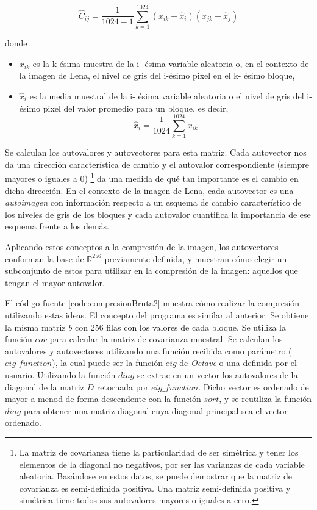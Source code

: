 \documentclass[twocolumn,a4paper,10pt]{article}
\begin{document}
\begin{equation}
    \widehat{C}_{ij} =  \frac{1}{1024 - 1}\sum_{k=1}^{1024} (x_{ik} - \widehat{x}_{i}) (x_{jk} - \widehat{x}_{j})
\end{equation}

donde
\begin{itemize}
    \item $x_{ik}$ es la k-\'esima muestra de la i- \'esima variable aleatoria o, en el contexto de la imagen de Lena, el nivel de gris del i-\'esimo pixel en el 
    k- \'esimo bloque,
    \item $\widehat{x}_{i}$ es la media muestral de la i- \'esima variable aleatoria o el nivel de gris del i-\'esimo pixel del valor promedio para un bloque, es decir,
    \[ \widehat{x}_{i} = \frac{1}{1024} \sum_{k=1}^{1024} x_{ik} \]
\end{itemize}

Se calculan los autovalores y autovectores para esta matriz. Cada autovector nos da una direcci\'on caracter\'istica de cambio y el autovalor correspondiente  (siempre mayores o iguales a 0) \footnote{La matriz de covarianza tiene la particularidad de ser sim\'etrica y tener los elementos de la diagonal no negativos, por ser las varianzas de cada variable aleatoria. Bas\'andose en estos datos, se puede demostrar que la matriz de covarianza es semi-definida positiva. Una matriz semi-definida positiva y sim\'etrica tiene todos sus autovalores mayores o iguales a cero.} da una medida de qu\'e tan importante es el cambio en dicha direcci\'on. En el contexto de la imagen de Lena, cada autovector es una \textit{autoimagen} con información respecto a un esquema de cambio caracter\'istico de los niveles de gris de los bloques y cada autovalor cuantifica la importancia de ese esquema frente a los dem\'as.

Aplicando estos conceptos a la compresión de la imagen, los autovectores conforman la base de $\mathbb{R}^{256}$ previamente definida, y muestran cómo elegir un subconjunto de estos para utilizar en la compresión de la imagen: aquellos que tengan el mayor autovalor.

El código fuente \ref{code:compresionBruta2} muestra cómo realizar la compresión utilizando estas ideas. El concepto del programa es similar al anterior. Se obtiene la misma matriz $b$ con 256 filas con los valores de cada bloque. Se utiliza la función $cov$ para calcular la matriz de covarianza muestral. Se calculan los autovalores y autovectores utilizando una función recibida como parámetro ($eig\_function$), la cual puede ser la función $eig$ de \textit{Octave} o una definida por el usuario. Utilizando la función $diag$ se extrae en un vector los autovalores de la diagonal de la matriz $D$ retornada por $eig\_function$. Dicho vector es ordenado de mayor a menod de forma descendente con la función $sort$, y se reutiliza la función $diag$ para obtener una matriz diagonal cuya diagonal principal sea el vector ordenado.
\end{document}

